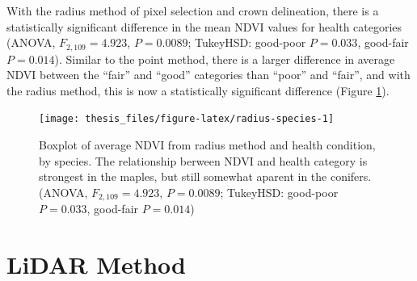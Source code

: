 \documentclass[12pt,twoside]{reedthesis}
\begin{document}
With the radius method of pixel selection and crown delineation, there is a statistically significant difference in the mean NDVI values for health categories (ANOVA, \(F_{2,109}=4.923\), \(P = 0.0089\); TukeyHSD: good-poor \(P = 0.033\), good-fair \(P = 0.014\)). Similar to the point method, there is a larger difference in average NDVI between the ``fair'' and ``good'' categories than ``poor'' and ``fair'', and with the radius method, this is now a statistically significant difference (Figure \ref{fig:radius-species}).
\begin{figure}
\texttt{[image: thesis\_files/figure-latex/radius-species-1]} \caption[Radius method mean NDVI and health condition by species]{Boxplot of average NDVI from radius method and health condition, by species. The relationship berween NDVI and health category is strongest in the maples, but still somewhat aparent in the conifers. (ANOVA, $F_{2,109}=4.923$, $P = 0.0089$; TukeyHSD: good-poor $P = 0.033$, good-fair $P = 0.014$)}\label{fig:radius-species}
\end{figure}
\hypertarget{lidar-method-1}{%
\section{LiDAR Method}\label{lidar-method-1}}
\end{document}
